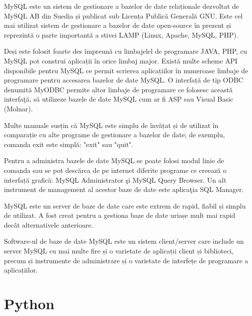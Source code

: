 \par MySQL este un sistem de gestionare a bazelor de date relaționale dezvoltat de MySQL AB din Suedia și publicat sub Licența Publică Generală GNU. Este cel mai utilizat sistem de gestionare a bazelor de date open-source în prezent și reprezintă o parte importantă a stivei LAMP (Linux, Apache, MySQL, PHP).
\par Deși este folosit foarte des împreună cu limbajelel de programare JAVA, PHP, cu MySQL pot construi aplicații în orice limbaj major. Există multe scheme API disponibile pentru MySQL ce permit scrierea aplicațiilor în numeroase limbaje de programare pentru accesarea bazelor de date MySQL. O interfață de tip ODBC denumită MyODBC permite altor limbaje de programare ce folosesc această interfaţă, să utilizeze bazele de date MySQL cum ar fi ASP sau Visual Basic  (Molnar). 
\par Multe manuale susțin că MySQL este simplu de învățat și de utilizat în comparație cu alte programe de gestionare a bazelor de date; de exemplu, comanda exit este simplă: "exit" sau "quit". 
\par Pentru a administra bazele de date MySQL se poate folosi modul linie de comanda sau se pot descărca de pe internet diferite programe ce creează o interfață grafică: MySQL Administrator şi MySQL Query Browser. Un alt instrument de management al acestor baze de date este aplicaţia SQL Manager. 
\par MySQL este un server de baze de date care este extrem de rapid, fiabil și simplu de utilizat. A fost creat pentru a gestiona baze de date uriașe mult mai rapid decât alternativele anterioare.
\par Software-ul de baze de date MySQL este un sistem client/server care include un server MySQL cu mai multe fire și o varietate de aplicații client și biblioteci, precum și instrumente de administrare și o varietate de interfețe de programare a aplicațiilor.
 
\section{Python}
\label{sec:ch3sec4}

